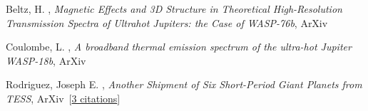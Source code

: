 \item[{\color{numcolor}\scriptsize3}] Beltz, H. , \emph{Magnetic Effects and 3D Structure in Theoretical High-Resolution Transmission Spectra of Ultrahot Jupiters: the Case of WASP-76b}, ArXiv\

\item[{\color{numcolor}\scriptsize2}] Coulombe, L. , \emph{A broadband thermal emission spectrum of the ultra-hot Jupiter WASP-18b}, ArXiv\

\item[{\color{numcolor}\scriptsize1}] Rodriguez, Joseph E. , \emph{Another Shipment of Six Short-Period Giant Planets from TESS}, ArXiv\  [\href{https://ui.adsabs.harvard.edu/abs/2022arXiv220505709R}{3 citations}]

